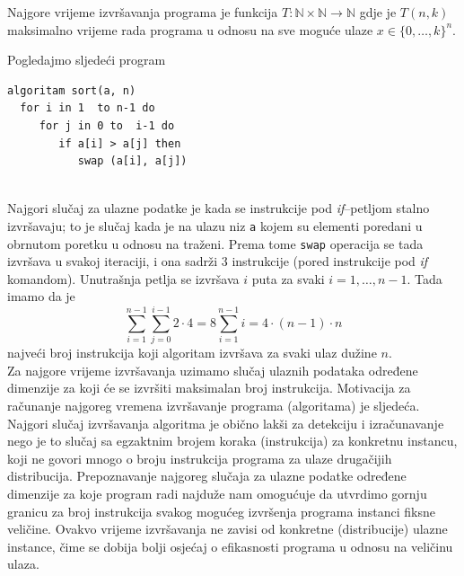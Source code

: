 \begin{definition}
	  Najgore vrijeme izvršavanja programa je funkcija $T \colon \mathbb{N} \times \mathbb{N} \rightarrow \mathbb{N}$ gdje je $T (n, k)$ maksimalno
	vrijeme rada programa u odnosu na sve moguće ulaze $x \in  \{0, \ldots , k\}^n$.
\end{definition}

\begin{example} 
	
	Pogledajmo sljedeći program  \\  %
\begin{verbatim}
algoritam sort(a, n)
  for i in 1  to n-1 do
     for j in 0 to  i-1 do
        if a[i] > a[j] then
           swap (a[i], a[j])
           
           	\end{verbatim}
\end{example}

Najgori slučaj za ulazne podatke je kada se instrukcije pod \emph{if}--petljom stalno izvršavaju; to je slučaj kada je na ulazu niz \texttt{a} kojem su elementi poredani u obrnutom  poretku u odnosu na traženi. Prema tome \texttt{swap} operacija se tada izvršava u svakoj iteraciji, i ona sadrži 3 instrukcije (pored instrukcije pod \emph{if} komandom). Unutrašnja petlja se izvršava $i$ puta  za svaki $i=1, \ldots, n-1$.  Tada imamo da je  
$$ \sum_{i=1}^{n-1} \sum_{j=0}^{i-1} 2 \cdot 4 = 8 \sum_{i=1}^{n-1} i = 4 \cdot {(n-1) \cdot n}$$ najveći broj instrukcija koji algoritam izvršava za svaki ulaz dužine $n$. 
\\


Za najgore vrijeme izvršavanja  uzimamo slučaj ulaznih podataka određe\-ne dimenzije za koji će se izvršiti maksimalan broj instrukcija. Motivacija za računanje najgoreg vremena izvršavanje programa (algoritama) je sljedeća. Najgori slučaj izvršavanja algoritma je obično lakši za detekciju i izračunava\-nje nego je to slučaj sa   egzaktnim brojem koraka (instrukcija) za konkretnu instancu, koji ne govori mnogo o broju instrukcija programa za ulaze drugači\-jih distribucija. Prepoznavanje najgoreg slučaja za ulazne podatke određene dimenzije za koje program radi najduže nam omogućuje da utvrdimo gornju granicu za broj instrukcija svakog mogućeg izvršenja programa instanci fiksne veličine. Ovakvo vrijeme izvršavanja ne  zavisi od konkretne (distribu\-cije) ulazne instance, čime se dobija bolji osjećaj o efikasnosti programa u odnosu na veličinu ulaza.
 
